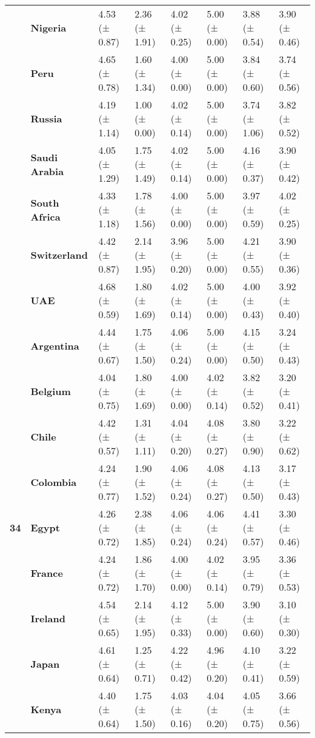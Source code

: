 \begin{longtable}{llllllll}
\textbf{} & \textbf{Nigeria} & 4.53 (± 0.87) & 2.36 (± 1.91) & 4.02 (± 0.25) & 5.00 (± 0.00) & 3.88 (± 0.54) & 3.90 (± 0.46) \\
\textbf{} & \textbf{Peru} & 4.65 (± 0.78) & 1.60 (± 1.34) & 4.00 (± 0.00) & 5.00 (± 0.00) & 3.84 (± 0.60) & 3.74 (± 0.56) \\
\textbf{} & \textbf{Russia} & 4.19 (± 1.14) & 1.00 (± 0.00) & 4.02 (± 0.14) & 5.00 (± 0.00) & 3.74 (± 1.06) & 3.82 (± 0.52) \\
\textbf{} & \textbf{Saudi Arabia} & 4.05 (± 1.29) & 1.75 (± 1.49) & 4.02 (± 0.14) & 5.00 (± 0.00) & 4.16 (± 0.37) & 3.90 (± 0.42) \\
\textbf{} & \textbf{South Africa} & 4.33 (± 1.18) & 1.78 (± 1.56) & 4.00 (± 0.00) & 5.00 (± 0.00) & 3.97 (± 0.59) & 4.02 (± 0.25) \\
\textbf{} & \textbf{Switzerland} & 4.42 (± 0.87) & 2.14 (± 1.95) & 3.96 (± 0.20) & 5.00 (± 0.00) & 4.21 (± 0.55) & 3.90 (± 0.36) \\
\textbf{} & \textbf{UAE} & 4.68 (± 0.59) & 1.80 (± 1.69) & 4.02 (± 0.14) & 5.00 (± 0.00) & 4.00 (± 0.43) & 3.92 (± 0.40) \\
\cline{1-8}
\multirow[t]{19}{*}{\textbf{34}} & \textbf{Argentina} & 4.44 (± 0.67) & 1.75 (± 1.50) & 4.06 (± 0.24) & 5.00 (± 0.00) & 4.15 (± 0.50) & 3.24 (± 0.43) \\
\textbf{} & \textbf{Belgium} & 4.04 (± 0.75) & 1.80 (± 1.69) & 4.00 (± 0.00) & 4.02 (± 0.14) & 3.82 (± 0.52) & 3.20 (± 0.41) \\
\textbf{} & \textbf{Chile} & 4.42 (± 0.57) & 1.31 (± 1.11) & 4.04 (± 0.20) & 4.08 (± 0.27) & 3.80 (± 0.90) & 3.22 (± 0.62) \\
\textbf{} & \textbf{Colombia} & 4.24 (± 0.77) & 1.90 (± 1.52) & 4.06 (± 0.24) & 4.08 (± 0.27) & 4.13 (± 0.50) & 3.17 (± 0.43) \\
\textbf{} & \textbf{Egypt} & 4.26 (± 0.72) & 2.38 (± 1.85) & 4.06 (± 0.24) & 4.06 (± 0.24) & 4.41 (± 0.57) & 3.30 (± 0.46) \\
\textbf{} & \textbf{France} & 4.24 (± 0.72) & 1.86 (± 1.70) & 4.00 (± 0.00) & 4.02 (± 0.14) & 3.95 (± 0.79) & 3.36 (± 0.53) \\
\textbf{} & \textbf{Ireland} & 4.54 (± 0.65) & 2.14 (± 1.95) & 4.12 (± 0.33) & 5.00 (± 0.00) & 3.90 (± 0.60) & 3.10 (± 0.30) \\
\textbf{} & \textbf{Japan} & 4.61 (± 0.64) & 1.25 (± 0.71) & 4.22 (± 0.42) & 4.96 (± 0.20) & 4.10 (± 0.41) & 3.22 (± 0.59) \\
\textbf{} & \textbf{Kenya} & 4.40 (± 0.64) & 1.75 (± 1.50) & 4.03 (± 0.16) & 4.04 (± 0.20) & 4.05 (± 0.75) & 3.66 (± 0.56) \\

\end{longtable}
